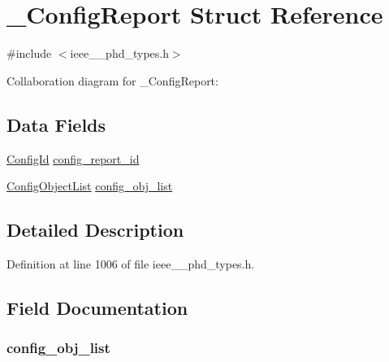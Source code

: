\hypertarget{struct___config_report}{}\section{\+\_\+\+Config\+Report Struct Reference}
\label{struct___config_report}


{\ttfamily \#include $<$ieee\+\_\+\_\+phd\+\_\+types.\+h$>$}



Collaboration diagram for \+\_\+\+Config\+Report\+:
\subsection*{Data Fields}
\begin{DoxyCompactItemize}
\item 
\hyperlink{ieee__11073__phd__types_8h_a4ad2ac77e47838307eaa3229d3102b29}{Config\+Id} \hyperlink{struct___config_report_a53985454c469ab7ba57b64e680cf8c73}{config\+\_\+report\+\_\+id}
\item 
\hyperlink{ieee__11073__phd__types_8h_a06776da089aed7354c9a9194cc7e0a29}{Config\+Object\+List} \hyperlink{struct___config_report_a6989ae8547f8afc89e345c174a0b9e2b}{config\+\_\+obj\+\_\+list}
\end{DoxyCompactItemize}


\subsection{Detailed Description}


Definition at line 1006 of file ieee\+\_\+\_\+phd\+\_\+types.\+h.



\subsection{Field Documentation}
\hypertarget{struct___config_report_a6989ae8547f8afc89e345c174a0b9e2b}{}
\subsubsection[{config\+\_\+obj\+\_\+list}]{ config\+\_\+obj\+\_\+list}\label{struct___config_report_a6989ae8547f8afc89e345c174a0b9e2b}


